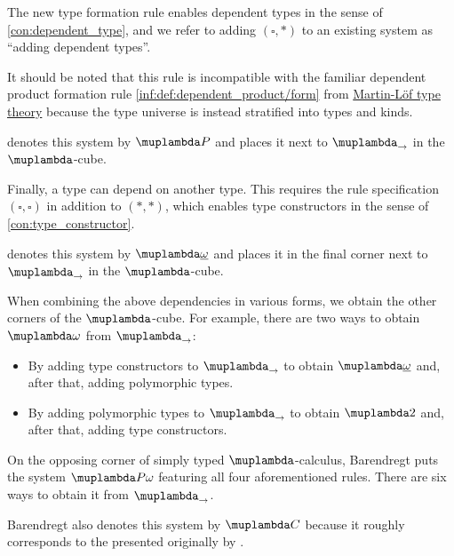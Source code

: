 \begin{definition}
\begin{thmenum}
    The new type formation rule enables dependent types in the sense of \cref{con:dependent_type}, and we refer to adding \( (\square, \ast) \) to an existing system as \enquote{adding dependent types}.

    It should be noted that this rule is incompatible with the familiar dependent product formation rule \ref{inf:def:dependent_product/form} from \hyperref[def:martin_lof_type_theory]{Martin-L\"of type theory} because the type universe is instead stratified into types and kinds.

    \Textcite[def. 5.1.8]{Barendregt1992LambdaCalculiWithTypes} denotes this system by \( \muplambda P \) and places it next to \( \muplambda_{\rightarrow} \) in the \( \muplambda \)-cube.

     Finally, a type can depend on another type. This requires the rule specification \( (\square, \square) \) in addition to \( (\ast, \ast) \), which enables type constructors in the sense of \cref{con:type_constructor}.

    \Textcite[def. 5.1.4]{Barendregt1992LambdaCalculiWithTypes} denotes this system by \( \muplambda \underline \omega \) and places it in the final corner next to \( \muplambda_{\rightarrow} \) in the \( \muplambda \)-cube.

     When combining the above dependencies in various forms, we obtain the other corners of the \( \muplambda \)-cube. For example, there are two ways to obtain \( \muplambda \omega \) from \( \muplambda_{\rightarrow} \):
    \begin{itemize}
      \item By adding type constructors to \( \muplambda_{\rightarrow} \) to obtain \( \muplambda \underline \omega \) and, after that, adding polymorphic types.

      \item By adding polymorphic types to \( \muplambda_{\rightarrow} \) to obtain \( \muplambda 2 \) and, after that, adding type constructors.
    \end{itemize}

    On the opposing corner of simply typed \( \muplambda \)-calculus, Barendregt puts the system \( \muplambda P \omega \) featuring all four aforementioned rules. There are six ways to obtain it from \( \muplambda_{\rightarrow} \).

    Barendregt also denotes this system by \( \muplambda C \) because it roughly corresponds to the  presented originally by \textcite{CoquandHuet1986CoC}.
  \end{thmenum}
\end{definition}

